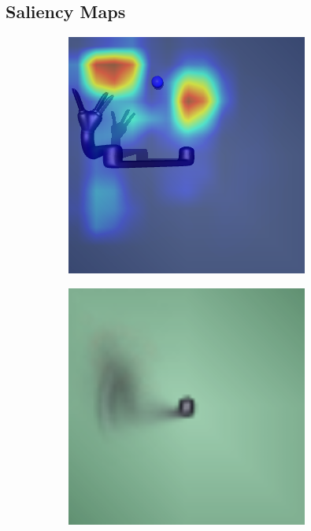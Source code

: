 \subsection{Saliency Maps}
\begin{figure}[h!]
  \centering
  \begin{subfigure}{0.24\columnwidth}
    \includegraphics[width=\linewidth]{figures/chapter6/occ_jaco_baseline}
  \end{subfigure}
  \begin{subfigure}{0.24\columnwidth}
    \includegraphics[width=\linewidth]{figures/chapter6/average_map_jaco_large.png}

\end{subfigure}
\end{figure}
